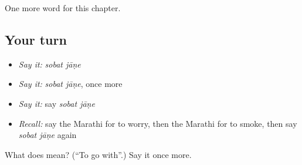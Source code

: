 \begin{grammarlens}[title={What you've built}]
One more word for this chapter.
\end{grammarlens}

\subsection*{Your turn}
\begin{itemize}
\raggedright
  \item \emph{Say it:} \emph{sobat jāṇe}
  \item \emph{Say it:} \emph{sobat jāṇe}, once more
  \item \emph{Say it:} say \emph{sobat jāṇe}
  \item \emph{Recall:} say the Marathi for to worry, then the Marathi for to smoke, then say \emph{sobat jāṇe} again
\end{itemize}

\begin{tcolorbox}[breakable,colback=teal!4,colframe=teal!35!black,title={Before you move on}]
What does   mean? (\textquotedblleft{}To go with\textquotedblright{}.) Say it once more.
\end{tcolorbox}
